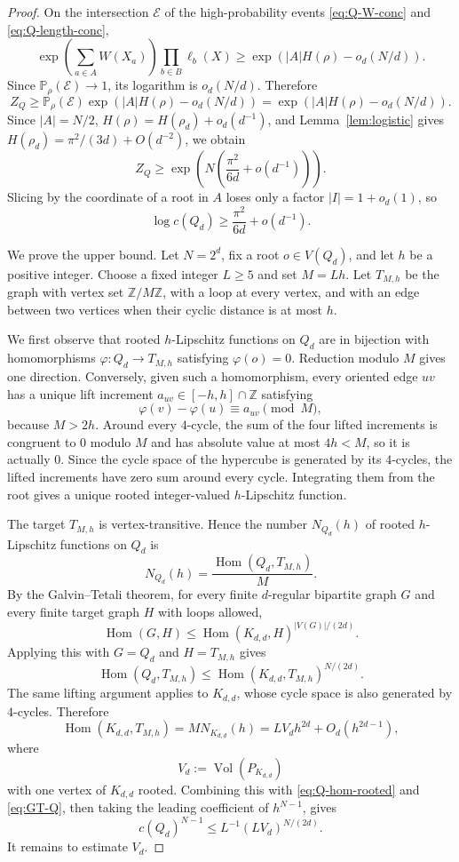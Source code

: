\documentclass[11pt]{article}
\theoremstyle{definition}
\DeclareMathOperator{\Vol}{Vol}
\DeclareMathOperator{\Hom}{Hom}
\newcommand{\ZZ}{\mathbb{Z}}
\newcommand{\PP}{\mathbb{P}}
\newcommand{\calE}{\mathcal{E}}
\begin{document}
\begin{proof}
\bigskip
\noindent
On the intersection $\calE$ of the high-probability events \eqref{eq:Q-W-conc} and \eqref{eq:Q-length-conc},
\[
  \exp\left(\sum_{a\in A}W(X_a)\right)
  \prod_{b\in B}\ell_b(X)
  \ge
  \exp\left(|A|H(\rho)-o_d(N/d)\right).
\]
Since $\PP_\rho(\calE)\to1$, its logarithm is $o_d(N/d)$.  Therefore
\[
  Z_Q\ge \PP_\rho(\calE)\exp\left(|A|H(\rho)-o_d(N/d)\right)
  =\exp\left(|A|H(\rho)-o_d(N/d)\right).
\]
Since $|A|=N/2$, $H(\rho)=H(\rho_d)+o_d(d^{-1})$, and Lemma~\ref{lem:logistic} gives $H(\rho_d)=\pi^2/(3d)+O(d^{-2})$, we obtain
\[
  Z_Q\ge \exp\left(N\left(\frac{\pi^2}{6d}+o(d^{-1})\right)\right).
\]
Slicing by the coordinate of a root in $A$ loses only a factor $|I|=1+o_d(1)$, so
\[
  \log c(Q_d)\ge\frac{\pi^2}{6d}+o(d^{-1}).
\]

\bigskip
\noindent
We prove the upper bound.  Let $N=2^d$, fix a root $o\in V(Q_d)$, and let $h$ be a positive integer.  Choose a fixed integer $L\ge5$ and set $M=Lh$.  Let $T_{M,h}$ be the graph with vertex set $\ZZ/M\ZZ$, with a loop at every vertex, and with an edge between two vertices when their cyclic distance is at most $h$.

\bigskip
\noindent
We first observe that rooted $h$-Lipschitz functions on $Q_d$ are in bijection with homomorphisms $\varphi:Q_d\to T_{M,h}$ satisfying $\varphi(o)=0$.  Reduction modulo $M$ gives one direction.  Conversely, given such a homomorphism, every oriented edge $uv$ has a unique lift increment $a_{uv}\in[-h,h]\cap\ZZ$ satisfying
\[
  \varphi(v)-\varphi(u)\equiv a_{uv}\pmod M,
\]
because $M>2h$.  Around every $4$-cycle, the sum of the four lifted increments is congruent to $0$ modulo $M$ and has absolute value at most $4h<M$, so it is actually $0$.  Since the cycle space of the hypercube is generated by its $4$-cycles, the lifted increments have zero sum around every cycle.  Integrating them from the root gives a unique rooted integer-valued $h$-Lipschitz function.

\bigskip
\noindent
The target $T_{M,h}$ is vertex-transitive.  Hence the number $N_{Q_d}(h)$ of rooted $h$-Lipschitz functions on $Q_d$ is
\begin{equation}\label{eq:Q-hom-rooted}
  N_{Q_d}(h)=\frac{\Hom(Q_d,T_{M,h})}{M}.
\end{equation}
By the Galvin--Tetali theorem, for every finite $d$-regular bipartite graph $G$ and every finite target graph $H$ with loops allowed,
\[
  \Hom(G,H)\le \Hom(K_{d,d},H)^{|V(G)|/(2d)}.
\]
Applying this with $G=Q_d$ and $H=T_{M,h}$ gives
\begin{equation}\label{eq:GT-Q}
  \Hom(Q_d,T_{M,h})
  \le \Hom(K_{d,d},T_{M,h})^{N/(2d)}.
\end{equation}
The same lifting argument applies to $K_{d,d}$, whose cycle space is also generated by $4$-cycles.  Therefore
\[
  \Hom(K_{d,d},T_{M,h})=M N_{K_{d,d}}(h)
  =L V_d h^{2d}+O_d(h^{2d-1}),
\]
where
\[
  V_d:=\Vol(P_{K_{d,d}})
\]
with one vertex of $K_{d,d}$ rooted.  Combining this with \eqref{eq:Q-hom-rooted} and \eqref{eq:GT-Q}, then taking the leading coefficient of $h^{N-1}$, gives
\begin{equation}\label{eq:Q-coeff-bound}
  c(Q_d)^{N-1}
  \le L^{-1}(L V_d)^{N/(2d)}.
\end{equation}
It remains to estimate $V_d$.


\end{proof}
\end{document}
